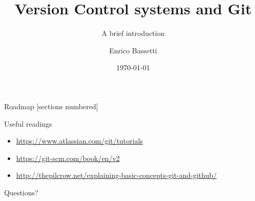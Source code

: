 \documentclass[10pt]{beamer}
\title{Version Control systems and Git}
\subtitle{A brief introduction}
\date{\today}
\author{Enrico Bassetti}
\institute{Sapienza - University of Rome}
\begin{document}

\maketitle

\begin{frame}{Roadmap}
  [sections numbered]
  \tableofcontents[hideallsubsections]
\end{frame}




\begin{frame}{Useful readings}

\begin{itemize}
  \item \url{https://www.atlassian.com/git/tutorials}
  \item \url{https://git-scm.com/book/en/v2}
  \item \url{http://thepilcrow.net/explaining-basic-concepts-git-and-github/}
\end{itemize}

\end{frame}

\begin{frame}[standout]
  Questions?
\end{frame}

\begin{frame}{}

  \begin{center}\ccbysa\end{center}

\end{frame}
\end{document}
